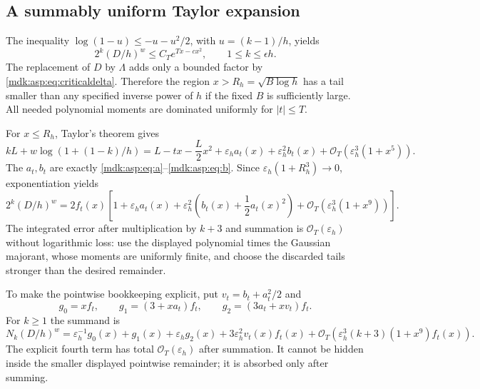 \documentclass[11pt,letterpaper]{article}
\numberwithin{equation}{section}
\theoremstyle{remark}\newtheorem{remark}[theorem]{Remark}
\newcommand{\Oh}{\mathcal O}\newcommand{\Q}{\mathbb Q}\newcommand{\N}{\mathbb N}\newcommand{\R}{\mathbb R}
\begin{document}
\subsection{A summably uniform Taylor expansion}
The inequality $\log(1-u)\le-u-u^2/2$, with $u=(k-1)/h$, yields
\begin{equation}\label{mdk:asp:eq:gaussian}
2^k(D/h)^w\le C_T e^{Tx-cx^2},\qquad1\le k\le\epsilon h.
\end{equation}
The replacement of $D$ by $\Lambda$ adds only a bounded factor by \eqref{mdk:asp:eq:criticaldelta}. Therefore the region $x>R_h=\sqrt{B\log h}$ has a tail smaller than any specified inverse power of $h$ if the fixed $B$ is sufficiently large. All needed polynomial moments are dominated uniformly for $|t|\le T$.

For $x\le R_h$, Taylor's theorem gives
\begin{equation}\label{mdk:asp:eq:logcritical}
kL+w\log(1+(1-k)/h)
=L-tx-\frac L2x^2+\varepsilon_h a_t(x)+\varepsilon_h^2b_t(x)
+\Oh_T(\varepsilon_h^3(1+x^5)).
\end{equation}
The $a_t,b_t$ are exactly \eqref{mdk:asp:eq:a}--\eqref{mdk:asp:eq:b}. Since $\varepsilon_h(1+R_h^3)\to0$, exponentiation yields
\begin{equation}\label{mdk:asp:eq:expcritical}
2^k(D/h)^w=2f_t(x)
\left[1+\varepsilon_ha_t(x)+\varepsilon_h^2\left(b_t(x)+\frac12a_t(x)^2\right)
+\Oh_T(\varepsilon_h^3(1+x^9))\right].
\end{equation}
The integrated error after multiplication by $k+3$ and summation is $\Oh_T(\varepsilon_h)$ without logarithmic loss: use the displayed polynomial times the Gaussian majorant, whose moments are uniformly finite, and choose the discarded tails stronger than the desired remainder.

To make the pointwise bookkeeping explicit, put $v_t=b_t+a_t^2/2$ and
\[
g_0=xf_t,\qquad g_1=(3+xa_t)f_t,\qquad g_2=(3a_t+xv_t)f_t.
\]
For $k\ge1$ the summand is
\begin{equation}\label{mdk:asp:eq:pointwise}
N_k(D/h)^w=\varepsilon_h^{-1}g_0(x)+g_1(x)+\varepsilon_hg_2(x)
+3\varepsilon_h^2v_t(x)f_t(x)
+\Oh_T(\varepsilon_h^3(k+3)(1+x^9)f_t(x)).
\end{equation}
The explicit fourth term has total $\Oh_T(\varepsilon_h)$ after summation. It cannot be hidden inside the smaller displayed pointwise remainder; it is absorbed only after summing.
\end{document}

